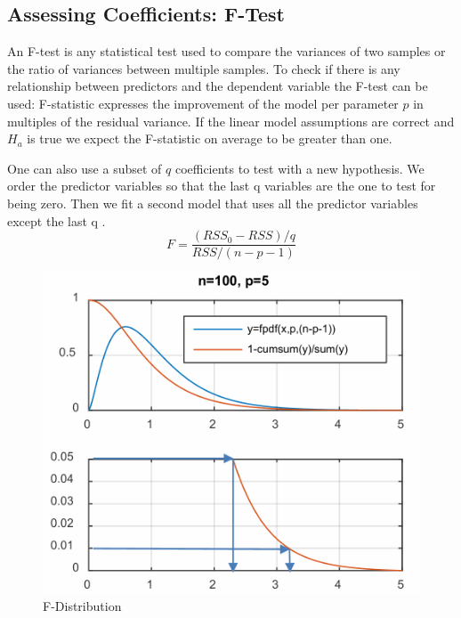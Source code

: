 \documentclass[../Main.tex]{subfiles}
\begin{document}
\subsection{Assessing Coefficients: F-Test}
An F-test is any statistical test used to compare the variances of two samples or the ratio of variances between multiple samples. To check if there is any relationship between predictors and the dependent variable the F-test can be used:
F-statistic expresses the improvement of the model per parameter \(p\) in multiples of the residual variance. If the linear model assumptions are correct and \(H_a\) is true we expect the F-statistic on average to be greater than one.

One can also use a subset of \(q\) coefficients to test with a new hypothesis. We order the predictor variables so that the last q variables are the one to test for being zero. Then we fit a second model that uses all the predictor variables except the last q .
\begin{equation}
    F = \frac{(RSS_0-RSS)/q}{RSS/(n-p-1)}
\end{equation}

\begin{figure}[H]
    \centering
    \includegraphics[width=0.5\linewidth]{Images/f-dist.png}
    \caption{F-Distribution}
\end{figure}
\end{document}
